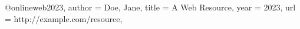 @online{web2023,
  author = {Doe, Jane},
  title = {A Web Resource},
  year = {2023},
  url = {http://example.com/resource},
}
